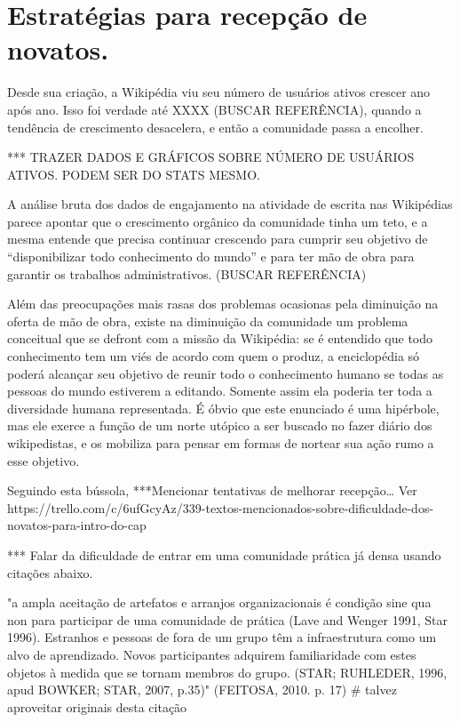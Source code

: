\section{Estratégias para recepção de novatos.}

Desde sua criação, a Wikipédia viu seu número de usuários ativos crescer ano após ano. Isso foi verdade até XXXX (BUSCAR REFERÊNCIA), quando a tendência de crescimento desacelera, e então a comunidade passa a encolher. 

*** TRAZER DADOS E GRÁFICOS SOBRE NÚMERO DE USUÁRIOS ATIVOS. PODEM SER DO STATS MESMO.

A análise bruta dos dados de engajamento na atividade de escrita nas Wikipédias parece apontar que o crescimento orgânico da comunidade tinha um teto, e a mesma entende que precisa continuar crescendo para cumprir seu objetivo de ``disponibilizar todo conhecimento do mundo'' e para ter mão de obra para garantir os trabalhos administrativos. (BUSCAR REFERÊNCIA)

Além das preocupações mais rasas dos problemas ocasionas pela diminuição na oferta de mão de obra, existe na diminuição da comunidade um problema conceitual que se defront com a missão da Wikipédia: se é entendido que todo conhecimento tem um viés de acordo com quem o produz, a enciclopédia só poderá alcançar seu objetivo de reunir todo o conhecimento humano se todas as pessoas do mundo estiverem a editando. Somente assim ela poderia ter toda a diversidade humana representada. É óbvio que este enunciado é uma hipérbole, mas ele exerce a função de um norte utópico a ser buscado no fazer diário dos wikipedistas, e os mobiliza para pensar em formas de nortear sua ação rumo a esse objetivo.

Seguindo esta bússola, ***Mencionar tentativas de melhorar recepção… Ver https://trello.com/c/6ufGcyAz/339-textos-mencionados-sobre-dificuldade-dos-novatos-para-intro-do-cap%

*** Falar da dificuldade de entrar em uma comunidade prática já densa usando citações abaixo.

"a ampla aceitação de artefatos e arranjos organizacionais é condição sine qua non para participar de uma comunidade de prática (Lave and Wenger 1991, Star 1996). Estranhos e pessoas de fora de um grupo têm a infraestrutura como um alvo de aprendizado. Novos participantes adquirem familiaridade com estes objetos à medida que se tornam membros do grupo. (STAR; RUHLEDER, 1996, apud BOWKER; STAR, 2007, p.35)" (FEITOSA, 2010. p. 17) # talvez aproveitar originais desta citação

